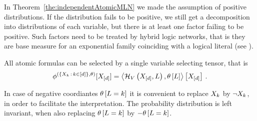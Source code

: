 
In Theorem~\ref{the:independentAtomicMLN} we made the assumption of positive distributions.
If the distribution fails to be positive, we still get a decomposition into distributions of each variable, but there is at least one factor failing to be positive.
Such factors need to be treated by hybrid logic networks, that is they are base measure for an exponential family coinciding with a logical literal (see ).

All atomic formulas can be selected by a single variable selecting tensor, that is
	\[ \phi^{(\{X_{k} \, : \, k\in[d]\},\theta)}[X_{[d]}]
	= \left\langle \mathcal{H}_{V}\left(X_{[d]},L\right),\theta\left[L\right]\right\rangle \left[ X_{[d]} \right] \, .
	\]
	
In case of negative coordiantes $\theta\left[L=k\right]$ it is convenient to replace $X_{k}$ by $\lnot X_{k}$, in order to facilitate the interpretation.
The probability distribution is left invariant, when also replacing $\theta\left[L=k\right]$ by $-\theta\left[L=k\right]$.




